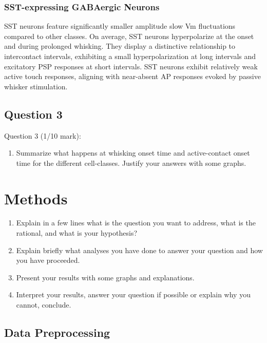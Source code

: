 \documentclass{IEEEtran}
\begin{document}
\subsubsection{SST-expressing GABAergic Neurons}
SST neurons feature significantly smaller amplitude slow Vm fluctuations compared to other classes. On average, SST neurons hyperpolarize at the onset and during prolonged whisking. They display a distinctive relationship to intercontact intervals, exhibiting a small hyperpolarization at long intervals and excitatory PSP responses at short intervals. SST neurons exhibit relatively weak active touch responses, aligning with near-absent AP responses evoked by passive whisker stimulation.


\subsection{Question 3}
Question 3 (1/10 mark):

\begin{enumerate}
  \item Summarize what happens at whisking onset time and active-contact onset time for the different cell-classes. Justify your answers with some graphs.
\end{enumerate}







\section{Methods}

\begin{enumerate}
  \item Explain in a few lines what is the question you want to address, what is the rational, and what is your hypothesis? %
  \item Explain briefly what analyses you have done to answer your question and how you have proceeded.
  \item Present your results with some graphs and explanations.
  \item Interpret your results, answer your question if possible or explain why you cannot, conclude.
\end{enumerate}

\subsection{Data Preprocessing}
\end{document}
